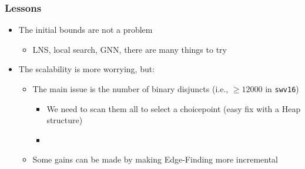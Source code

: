 \begin{frame}[fragile]
\frametitle{Lessons}
\vfill\pause
\begin{itemize}
	\item The initial bounds are not a problem 
	\vfill
	\begin{itemize}
		\item LNS, local search, GNN, there are many things to try
	\end{itemize}

	\vfill\pause
	\item The scalability is more worrying\pause, but:
	\vfill
	\begin{itemize}
		\item The main issue is the number of binary disjuncts (i.e., $\geq 12000$ in \texttt{swv16})

		\vfill\pause
		\begin{itemize}
			\item We need to scan them all to select a choicepoint (easy fix with a Heap structure)

			\vfill\pause
			\item {}
		\end{itemize}
\vfill\pause
		\item Some gains can be made by making Edge-Finding more incremental
	\end{itemize}
\end{itemize}
\vfill
\end{frame}


